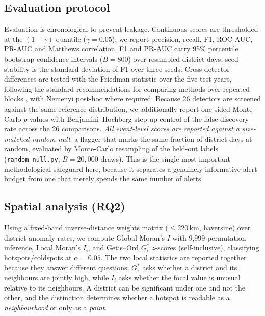 \documentclass[preprint,12pt]{elsarticle}
\begin{document}
\subsection{Evaluation protocol}\label{sec:protocol}
Evaluation is chronological to prevent leakage. Continuous scores are thresholded
at the $(1-\gamma)$ quantile ($\gamma=0.05$); we report precision, recall, F1,
ROC-AUC, PR-AUC and Matthews correlation. F1 and PR-AUC carry 95\% percentile
bootstrap confidence intervals ($B=800$) over resampled district-days;
seed-stability is the standard deviation of F1 over three seeds. Cross-detector
differences are tested with the Friedman statistic over the five test years,
following the standard recommendations for comparing methods over repeated
blocks \cite{demsar2006}, with Nemenyi post-hoc where required. Because 26
detectors are screened against the same reference distribution, we additionally
report one-sided Monte-Carlo $p$-values with Benjamini--Hochberg step-up control
of the false discovery rate across the 26 comparisons. \emph{All event-level
scores are reported against a size-matched random null}:
a flagger that marks the same fraction of district-days at random, evaluated by
Monte-Carlo resampling of the held-out labels (\texttt{random\_null.py},
$B=20{,}000$ draws). This is the single most important methodological
safeguard here, because it separates a genuinely informative alert budget from
one that merely spends the same number of alerts.

\subsection{Spatial analysis (RQ2)}\label{sec:spatial}
Using a fixed-band inverse-distance weights matrix ($\leq$220\,km, haversine)
over district anomaly rates, we compute Global Moran's $I$ with 9{,}999-permutation
inference, Local Moran's $I_i$, and Getis--Ord $G_i^*$ $z$-scores (self-inclusive),
classifying hotspots/coldspots at $\alpha=0.05$. The two local statistics are
reported together because they answer different questions: $G_i^*$ asks whether a
district and its neighbours are jointly high, while $I_i$ asks whether the focal
value is unusual relative to its neighbours. A district can be significant under
one and not the other, and the distinction determines whether a hotspot is
readable as a \emph{neighbourhood} or only as a \emph{point}.
\end{document}
